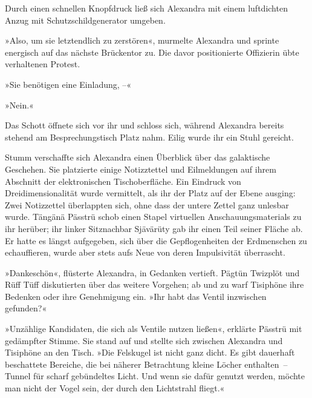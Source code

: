 Durch einen schnellen Knopfdruck ließ sich Alexandra mit einem luftdichten Anzug mit Schutzschildgenerator umgeben.


»Also, um sie letztendlich zu zerstören«, murmelte Alexandra und sprinte energisch auf das nächste Brückentor zu. Die davor positionierte Offizierin übte verhaltenen Protest.

»Sie benötigen eine Einladung, –«

»Nein.«

Das Schott öffnete sich vor ihr und schloss sich, während Alexandra bereits stehend am Besprechungstisch Platz nahm. Eilig wurde ihr ein Stuhl gereicht.

Stumm verschaffte sich Alexandra einen Überblick über das galaktische Geschehen. Sie platzierte einige Notizztettel und Eilmeldungen auf ihrem Abschnitt der elektronischen Tischoberfläche. Ein Eindruck von Dreidimensionalität wurde vermittelt, als ihr der Platz auf der Ebene ausging: Zwei Notizzettel überlappten sich, ohne dass der untere Zettel ganz unlesbar wurde. Tängänä Pässtrü schob einen Stapel virtuellen Anschauungsmaterials zu ihr herüber; ihr linker Sitznachbar Sjävärüty gab ihr einen Teil seiner Fläche ab. Er hatte es längst aufgegeben, sich über die Gepflogenheiten der Erdmenschen zu echauffieren, wurde aber stets aufs Neue von deren Impulsivität überrascht.

»Dankeschön«, flüsterte Alexandra, in Gedanken vertieft. Pägtün Twizplöt und Rüff Tüff diskutierten über das weitere Vorgehen; ab und zu warf Tisiphöne ihre Bedenken oder ihre Genehmigung ein. »Ihr habt das Ventil inzwischen gefunden?«

»Unzählige Kandidaten, die sich als Ventile nutzen ließen«, erklärte Pässtrü mit gedämpfter Stimme. Sie stand auf und stellte sich zwischen Alexandra und Tisiphöne an den Tisch. »Die Felskugel ist nicht ganz dicht. Es gibt dauerhaft beschattete Bereiche, die bei näherer Betrachtung kleine Löcher enthalten~– Tunnel für scharf gebündeltes Licht. Und wenn sie dafür genutzt werden, möchte man nicht der Vogel sein, der durch den Lichtstrahl fliegt.«

